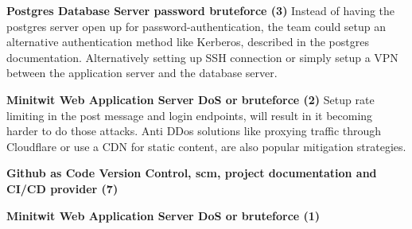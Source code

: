 \textbf{Postgres Database Server password bruteforce (3)}
Instead of having the postgres server open up for password-authentication, the team could setup an alternative authentication method like Kerberos, described in the postgres documentation\cite{postgres_auth_methods}.
Alternatively setting up SSH connection or simply setup a VPN between the application server and the database server.

\textbf{Minitwit Web Application Server DoS or bruteforce (2)}
Setup rate limiting in the post message and login endpoints, will result in it becoming harder to do those attacks. Anti DDos solutions like proxying traffic through Cloudflare or use a CDN for static content, are also popular mitigation strategies.\cite{owasp_dos_mitigation }

\textbf{Github as Code Version Control, \acrshort{scm}, project documentation and CI/CD provider (7)}

\textbf{Minitwit Web Application Server DoS or bruteforce (1)}